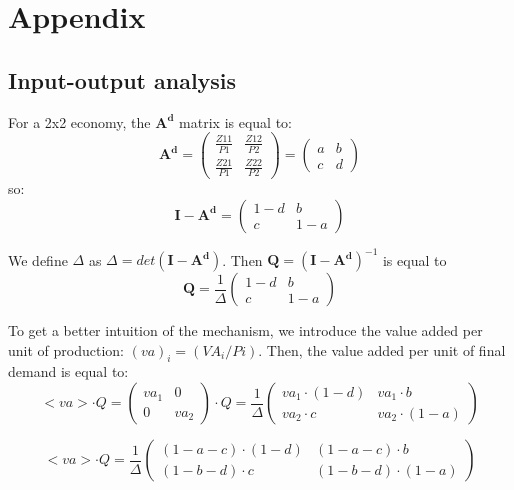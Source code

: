 \section*{Appendix}


\subsection{Input-output analysis}
\label{app:input_ouput}


For a 2x2 economy, the $\pmb{A^d}$ matrix is equal to:
$$ \pmb{A^d} = 
\begin{pmatrix} 
	\frac{Z11}{P1}  & \frac{Z12}{P2} \\
	\frac{Z21}{P1} & \frac{Z22}{P2} 
\end{pmatrix}
=
\begin{pmatrix} 
a  & b \\
c & d
\end{pmatrix}
$$
so:
$$\pmb{\pmb{I} - \pmb{A^d}} = 
\begin{pmatrix} 
1 - d  & b \\
c & 1 - a
\end{pmatrix}
$$

We define $\Delta$ as $\Delta = det(\pmb{I} - \pmb{A^d})$. Then
$\pmb{Q} = (\pmb{I} - \pmb{A^d})^{-1}$ is equal to
$$\pmb{Q} = \frac{1}{\Delta}
\begin{pmatrix} 
1 - d  & b \\
c & 1 - a
\end{pmatrix}
$$

To get a better intuition of the mechanism, we introduce the value added per unit of production: $(va)_i = (VA_i/Pi)$.
Then, the value added per unit of final demand is equal to:
$$<va> \cdot Q =
\begin{pmatrix} 
va_1 & 0 \\
0 & va_2
\end{pmatrix}
\cdot Q 
= \frac{1}{\Delta}
\begin{pmatrix} 
va_1 \cdot (1-d) & va_1 \cdot b \\
va_2 \cdot c & va_2 \cdot (1-a)
\end{pmatrix}
$$

$$<va> \cdot Q 
= \frac{1}{\Delta}
\begin{pmatrix} 
(1- a-c)\cdot (1-d) & (1-a-c) \cdot b \\
(1-b-d) \cdot c & (1-b-d) \cdot (1-a)
\end{pmatrix}
$$


